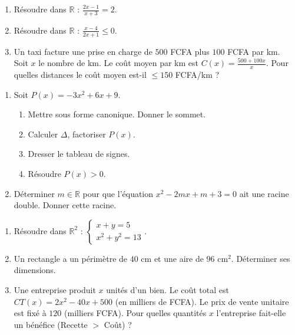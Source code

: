\documentclass[11pt]{article}
\begin{document}
\begin{exercice}
    \begin{enumerate}
        \item Résoudre dans $\mathbb{R}$ : $\frac{2x-1}{x+3} = 2$.
        \item Résoudre dans $\mathbb{R}$ : $\frac{x-4}{2x+1} \le 0$.
        \item Un taxi facture une prise en charge de $500$ FCFA plus $100$ FCFA par km. Soit $x$ le nombre de km. Le coût moyen par km est $C(x) = \frac{500+100x}{x}$. Pour quelles distances le coût moyen est-il $\le 150$ FCFA/km ?
    \end{enumerate}
\end{exercice}

\begin{exercice}
    \begin{enumerate}
        \item Soit $P(x) = -3x^2 + 6x + 9$.
        \begin{enumerate}
            \item Mettre sous forme canonique. Donner le sommet.
            \item Calculer $\Delta$, factoriser $P(x)$.
            \item Dresser le tableau de signes.
            \item Résoudre $P(x) > 0$.
        \end{enumerate}
        \item Déterminer $m \in \mathbb{R}$ pour que l'équation $x^2 - 2mx + m+3 = 0$ ait une racine double. Donner cette racine.
    \end{enumerate}
\end{exercice}

\begin{exercice}
    \begin{enumerate}
        \item Résoudre dans $\mathbb{R}^2$ : $\begin{cases} x+y=5 \\ x^2+y^2=13 \end{cases}$.
        \item Un rectangle a un périmètre de $40$ cm et une aire de $96$ cm$^2$. Déterminer ses dimensions.
        \item Une entreprise produit $x$ unités d'un bien. Le coût total est $CT(x) = 2x^2 - 40x + 500$ (en milliers de FCFA). Le prix de vente unitaire est fixé à $120$ (milliers FCFA). Pour quelles quantités $x$ l'entreprise fait-elle un bénéfice (Recette $>$ Coût) ?
    \end{enumerate}
\end{exercice}
\end{document}
